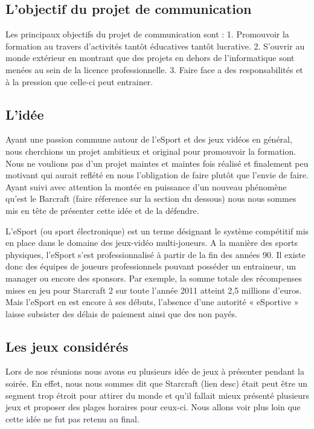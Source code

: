 \subsection{L'objectif du projet de communication}%
\label{sub:l_objectif_du_projet_de_communication}

Les principaux objectifs du projet de communication sont : 1. Promouvoir
la formation au travers d'activités tantôt éducatives tantôt lucrative.
2. S'ouvrir au monde extérieur en montrant que des projets en dehors de
l'informatique sont menées au sein de la licence professionnelle.  3.
Faire face a des responsabilités et à la pression que celle-ci peut
entrainer.

\subsection{L'idée}%
\label{sub:l_idee}

Ayant une passion commune autour de l'eSport et des jeux
vidéos en général, nous cherchions un projet ambitieux et original
pour promouvoir la formation. Nous ne voulions pas d'un projet maintes
et maintes fois réalisé et finalement peu motivant qui aurait
reflété en nous l'obligation de faire plutôt que l'envie de faire.
Ayant suivi avec attention la montée en puissance d'un nouveau
phénomène qu'est le Barcraft (faire réference sur la section du
dessous) nous nous sommes mis en tête de présenter cette idée et de la
défendre.

L’eSport (ou sport électronique) est un terme désignant le système 
compétitif mis en place dans le domaine des jeux-vidéo multi-joueurs. 
A la manière des sports physiques, l’eSport s’est professionnalisé à 
partir de la fin des années 90. Il existe donc des équipes de joueurs 
professionnels pouvant posséder un entraineur, un manager ou encore 
des sponsors. Par exemple, la somme totale des récompenses mises en jeu
pour Starcraft 2 sur toute l’année 2011 atteint 2,5 millions d’euros.
Mais l’eSport en est encore à ses débuts, l’absence d’une autorité 
« eSportive » laisse subsister des délais de paiement ainsi que des 
non payés.

\subsection{Les jeux considérés}%
\label{sub:les_jeux_consideres}

Lors de nos réunions nous avons eu plusieurs idée de jeux à présenter
pendant la soirée. En effet, nous nous sommes dit que Starcraft (lien
desc) était peut être un segment trop étroit pour attirer du monde et
qu'il fallait mieux présenté plusieurs jeux et proposer des plages
horaires pour ceux-ci. Nous allons voir plus loin que cette idée ne fut
pas retenu au final.


